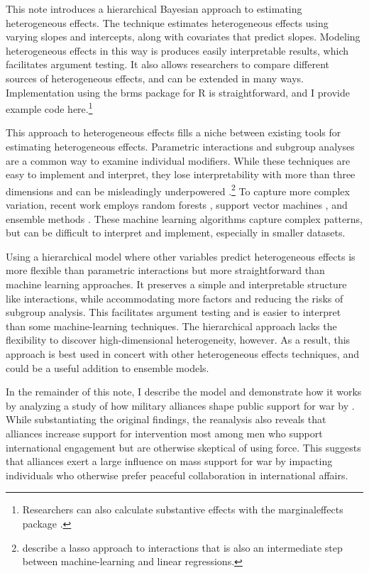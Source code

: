 \documentclass[12pt]{article}
\begin{document}

This note introduces a hierarchical Bayesian approach to estimating heterogeneous effects. 
The technique estimates heterogeneous effects using varying slopes and intercepts, along with covariates that predict slopes. 
Modeling heterogeneous effects in this way is produces easily interpretable results, which facilitates argument testing. 
It also allows researchers to compare different sources of heterogeneous effects, and can be extended in many ways.  
Implementation using the brms package for \textsf{R} is straightforward, and I provide example code here.\footnote{Researchers can also calculate substantive effects with the marginaleffects package \citep{ArelBundockme}.} 


This approach to heterogeneous effects fills a niche between existing tools for estimating heterogeneous effects.
Parametric interactions and subgroup analyses are a common way to examine individual modifiers. 
While these techniques are easy to implement and interpret, they lose interpretability with more than three dimensions and can be misleadingly underpowered \citep{Simmonsetal2011}.\footnote{\citet{BlackwellOlson2022} describe a lasso approach to interactions that is also an intermediate step between machine-learning and linear regressions.}
To capture more complex variation, recent work employs random forests \citep{GreenKern2012, WagerAthey2018}, support vector machines \citep{ImaiRatkovic2013}, and ensemble methods \citep{Grimmeretal2017, Kuenzeletal2019, Dorieetal2022}.
These machine learning algorithms capture complex patterns, but can be difficult to interpret and implement, especially in smaller datasets. 

 
Using a hierarchical model where other variables predict heterogeneous effects is more flexible than parametric interactions but more straightforward than machine learning approaches.  
It preserves a simple and interpretable structure like interactions, while accommodating more factors and reducing the risks of subgroup analysis. 
This facilitates argument testing and is easier to interpret than some machine-learning techniques.
The hierarchical approach lacks the flexibility to discover high-dimensional heterogeneity, however.  
As a result, this approach is best used in concert with other heterogeneous effects techniques, and could be a useful addition to ensemble models. 


In the remainder of this note, I describe the model and demonstrate how it works by analyzing a study of how military alliances shape public support for war by \citet{TomzWeeks2021}. 
While substantiating the original findings, the reanalysis also reveals that alliances increase support for intervention most among men who support international engagement but are otherwise skeptical of using force. 
This suggests that alliances exert a large influence on mass support for war by impacting individuals who otherwise prefer peaceful collaboration in international affairs. 
\end{document}
